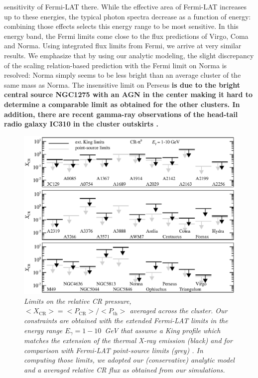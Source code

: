 \documentclass[10pt,aps,pra,reprint,amsmath,amsfonts,amssymb,showpacs,nofootinbib,floatfix]{revtex4-1}
\def\C#1{{\bf #1}}
\newcommand{\rmn}{\mathrm}
\begin{document}
sensitivity of Fermi-LAT there. While the effective area of Fermi-LAT
increases up to these energies, the typical photon spectra decrease as
a function of energy: combining those effects selects this energy
range to be most sensitive.  In this energy band, the Fermi limits
come close to the flux predictions of Virgo, Coma and Norma. Using
integrated flux limits from Fermi, we arrive at very similar results.
We emphasize that by using our analytic modeling, the slight
discrepancy of the scaling relation-based prediction with the Fermi
limit on Norma \cite{2010ApJ...717L..71A} is resolved: Norma simply
seems to be less bright than an average cluster of the same mass as
Norma. The insensitive limit on Perseus \C{is due to the bright
  central source NGC1275 with an AGN in the center
  \cite{2010ATel.2916....1M} making it hard to determine a comparable
  limit as obtained for the other clusters. In addition, there are
recent gamma-ray observations of the head-tail radio galaxy IC310 in
the cluster outskirts \cite{2010ApJ...723L.207A,2010A&A...519L...6N}.}


\begin{figure}
\begin{minipage}{2.0\columnwidth}
  \includegraphics[width=0.99\columnwidth]{figures/XCR.Fermi.eps}
  \caption{\it Limits on the relative CR pressure, $< X_\rmn{CR}> = <
    P_\rmn{CR} > / < P_\rmn{th}>$ averaged across the cluster. Our
    constraints are obtained with the extended Fermi-LAT limits in the energy
    range $E_\gamma=1-10$~GeV that assume a King profile which matches the
    extension of the thermal X-ray emission (black) and for comparison with
    Fermi-LAT point-source limits (grey) \cite{2010ApJ...717L..71A}. In
    computing those limits, we adopted our (conservative) analytic model
    \cite{2010MNRAS.409..449P} and a averaged relative CR flux as obtained from
    our simulations.}
 \label{fig:XCR}
\end{minipage}
\end{figure}
\end{document}
